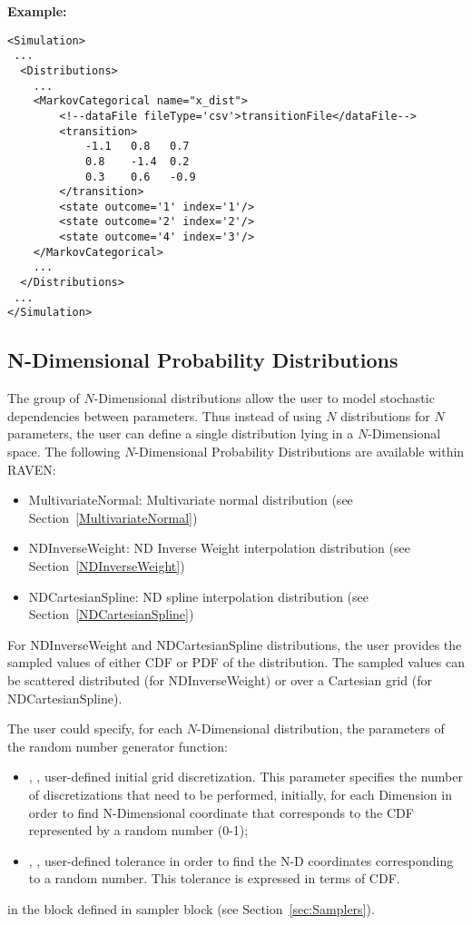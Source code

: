 \textbf{Example:}

\begin{lstlisting}[style=XML]
<Simulation>
 ...
  <Distributions>
    ...
    <MarkovCategorical name="x_dist">
        <!--dataFile fileType='csv'>transitionFile</dataFile-->
        <transition>
            -1.1   0.8   0.7
            0.8    -1.4  0.2
            0.3    0.6   -0.9
        </transition>
        <state outcome='1' index='1'/>
        <state outcome='2' index='2'/>
        <state outcome='4' index='3'/>
    </MarkovCategorical>
    ...
  </Distributions>
 ...
</Simulation>
\end{lstlisting}



\subsection{N-Dimensional Probability Distributions}
\label{subsec:NdDist}
The group of $N$-Dimensional distributions allow the user to model stochastic dependencies between parameters. Thus instead of using $N$ distributions for $N$ parameters, the user can define a single distribution lying in a $N$-Dimensional space.
The following $N$-Dimensional Probability Distributions are available within RAVEN:
\begin{itemize}
\item MultivariateNormal: Multivariate normal distribution (see Section~\ref{MultivariateNormal})
\item NDInverseWeight: ND Inverse Weight interpolation distribution (see Section~\ref{NDInverseWeight})
\item NDCartesianSpline: ND spline interpolation distribution (see Section~\ref{NDCartesianSpline})
\end{itemize}
For NDInverseWeight and NDCartesianSpline distributions, the user provides the sampled values of either CDF or PDF of the distribution. The sampled values can be scattered distributed (for NDInverseWeight) or over a Cartesian grid (for NDCartesianSpline).

The user could specify, for each $N$-Dimensional distribution, the parameters of the random number generator function:
\begin{itemize}
\item {}, , user-defined initial grid discretization. This parameter specifies the number of discretizations that need to be performed, initially, for each Dimension in
order to find N-Dimensional coordinate that corresponds to the CDF represented by a random number (0-1);
\item {}, , user-defined tolerance in order to find the N-D coordinates corresponding to a random number. This tolerance is expressed in terms of CDF.
\end{itemize}
in the  block defined in sampler block  (see Section~\ref{sec:Samplers}).

